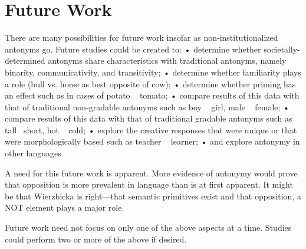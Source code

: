 \section {Future Work}
There are many possibilities for future work insofar as non-institutionalized antonyms go.  Future studies could be created to:
	•	determine whether societally-determined antonyms share characteristics with traditional antonyms, namely binarity, communicativity, and transitivity;
	•	determine whether familiarity plays a role (bull vs. horse as best opposite of cow);
	•	determine whether priming has an effect such as in cases of potato ~ tomato;
	•	compare results of this data with that of traditional non-gradable antonyms such as boy ~ girl, male ~ female;
	•	compare results of this data with that of traditional gradable antonyms such as tall ~short, hot ~ cold;
	•	explore the creative responses that were unique or that were morphologically based such as teacher ~ learner;
	•	and explore antonymy in other languages.  

A need for this future work is apparent.  More evidence of antonymy would prove that opposition is more prevalent in language than is at first apparent.  It might be that Wierzbicka is right—that semantic primitives exist and that opposition, a NOT element plays a major role.

Future work need not focus on only one of the above aspects at a time.  Studies could perform two or more of the above if desired.

